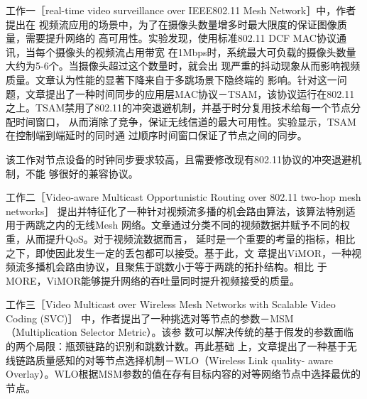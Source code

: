 工作一［real-time video surveillance over IEEE802.11 Mesh Network］中，作者提出在
视频流应用的场景中，为了在摄像头数量增多时最大限度的保证图像质量，需要提升网络的
高可用性。实验发现，使用标准802.11 DCF MAC协议通讯，当每个摄像头的视频流占用带宽
在1Mbps时，系统最大可负载的摄像头数量大约为5-6个。当摄像头超过这个数量时，就会出
现严重的抖动现象从而影响视频质量。文章认为性能的显著下降来自于多跳场景下隐终端的
影响。针对这一问题，文章提出了一种时间同步的应用层MAC协议－TSAM，该协议运行在802.11
之上。TSAM禁用了802.11的冲突退避机制，并基于时分复用技术给每一个节点分配时间窗口，
从而消除了竞争，保证无线信道的最大可用性。实验显示，TSAM在控制端到端延时的同时通
过顺序时间窗口保证了节点之间的同步。

该工作对节点设备的时钟同步要求较高，且需要修改现有802.11协议的冲突退避机制，不能
够很好的兼容协议。

工作二［Video-aware Multicast Opportunistic Routing over 802.11 two-hop mesh networks］
提出并特征化了一种针对视频流多播的机会路由算法，该算法特别适用于两跳之内的无线Mesh
网络。文章通过分类不同的视频数据并赋予不同的权重，从而提升QoS。对于视频流数据而言，
延时是一个重要的考量的指标，相比之下，即使因此发生一定的丢包都可以接受。基于此，文
章提出ViMOR，一种视频流多播机会路由协议，且聚焦于跳数小于等于两跳的拓扑结构。相比
于MORE，ViMOR能够提升网络的吞吐量同时提升视频接受的质量。

工作三［Video Multicast over Wireless Mesh Networks with Scalable Video Coding (SVC)］
中，作者提出了一种挑选对等节点的参数－MSM（Multiplication Selector Metric）。该参
数可以解决传统的基于假发的参数面临的两个局限：瓶颈链路的识别和跳数计数。再此基础
上，文章提出了一种基于无线链路质量感知的对等节点选择机制－WLO（Wireless Link quality-
aware Overlay）。WLO根据MSM参数的值在存有目标内容的对等网络节点中选择最优的节点。



